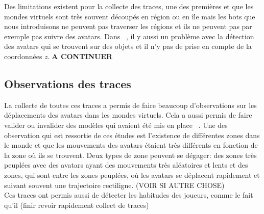 	Des limitations existent pour la collecte des traces, une des premières et que les mondes virtuels sont très souvent découpés en région ou en île mais les bots que nous introduisons ne peuvent pas traverser les régions et ils ne peuvent pas par exemple pas suivre des avatars. Dans ~\cite{DBLP:journals/corr/abs-0807-2328}, il y aussi un problème avec la détection des avatars qui se trouvent sur des objets et il n'y pas de prise en compte de la coordonnées \textit{z}. \textbf{A CONTINUER}	

	\subsection{Observations des traces}
	 La collecte de toutes ces traces a permis de faire beaucoup d'observations sur les déplacements des avatars dans les mondes virtuels. Cela a aussi permis de faire valider ou invalider des modèles qui avaient été mis en place ~\cite{DBLP:journals/corr/abs-0807-2328}. Une des observation qui est ressortie de ces études est l'existence de différentes zones dans le monde et que les mouvements des avatars étaient très différents en fonction de la zone où ils se trouvent. Deux types de zone peuvent se dégager: des zones très peuplées avec des avatars ayant des mouvements très aléatoires et lents et des zones, qui sont entre les zones peuplées, où les avatars se déplacent rapidement et suivant souvent une trajectoire rectiligne. (VOIR SI AUTRE CHOSE) \\
	
	Ces traces ont permis aussi de détecter les habitudes des joueurs, comme le fait qu'il (finir revoir rapidement collect de traces)
	
